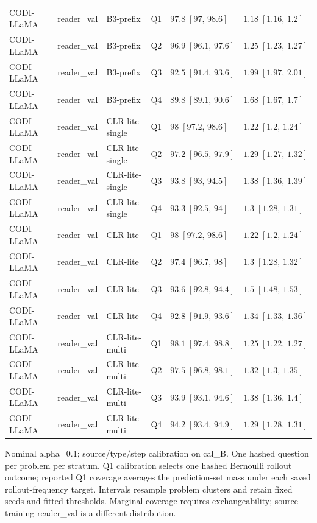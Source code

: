 \begin{longtable}{@{}p{}p{}p{}p{}p{}p{}@{}}
CODI-LLaMA & reader\_val & B3-prefix & Q1 & $97.8\;[97,\,98.6]$ & $1.18\;[1.16,\,1.2]$ \\
CODI-LLaMA & reader\_val & B3-prefix & Q2 & $96.9\;[96.1,\,97.6]$ & $1.25\;[1.23,\,1.27]$ \\
CODI-LLaMA & reader\_val & B3-prefix & Q3 & $92.5\;[91.4,\,93.6]$ & $1.99\;[1.97,\,2.01]$ \\
CODI-LLaMA & reader\_val & B3-prefix & Q4 & $89.8\;[89.1,\,90.6]$ & $1.68\;[1.67,\,1.7]$ \\
CODI-LLaMA & reader\_val & CLR-lite-single & Q1 & $98\;[97.2,\,98.6]$ & $1.22\;[1.2,\,1.24]$ \\
CODI-LLaMA & reader\_val & CLR-lite-single & Q2 & $97.2\;[96.5,\,97.9]$ & $1.29\;[1.27,\,1.32]$ \\
CODI-LLaMA & reader\_val & CLR-lite-single & Q3 & $93.8\;[93,\,94.5]$ & $1.38\;[1.36,\,1.39]$ \\
CODI-LLaMA & reader\_val & CLR-lite-single & Q4 & $93.3\;[92.5,\,94]$ & $1.3\;[1.28,\,1.31]$ \\
CODI-LLaMA & reader\_val & CLR-lite & Q1 & $98\;[97.2,\,98.6]$ & $1.22\;[1.2,\,1.24]$ \\
CODI-LLaMA & reader\_val & CLR-lite & Q2 & $97.4\;[96.7,\,98]$ & $1.3\;[1.28,\,1.32]$ \\
CODI-LLaMA & reader\_val & CLR-lite & Q3 & $93.6\;[92.8,\,94.4]$ & $1.5\;[1.48,\,1.53]$ \\
CODI-LLaMA & reader\_val & CLR-lite & Q4 & $92.8\;[91.9,\,93.6]$ & $1.34\;[1.33,\,1.36]$ \\
CODI-LLaMA & reader\_val & CLR-lite-multi & Q1 & $98.1\;[97.4,\,98.8]$ & $1.25\;[1.22,\,1.27]$ \\
CODI-LLaMA & reader\_val & CLR-lite-multi & Q2 & $97.5\;[96.8,\,98.1]$ & $1.32\;[1.3,\,1.35]$ \\
CODI-LLaMA & reader\_val & CLR-lite-multi & Q3 & $93.9\;[93.1,\,94.6]$ & $1.38\;[1.36,\,1.4]$ \\
CODI-LLaMA & reader\_val & CLR-lite-multi & Q4 & $94.2\;[93.4,\,94.9]$ & $1.29\;[1.28,\,1.31]$ \\
\bottomrule
\end{longtable}
\noindent Nominal alpha=0.1; source/type/step calibration on cal\_B. One hashed question per problem per stratum. Q1 calibration selects one hashed Bernoulli rollout outcome; reported Q1 coverage averages the prediction-set mass under each saved rollout-frequency target. Intervals resample problem clusters and retain fixed seeds and fitted thresholds. Marginal coverage requires exchangeability; source-training reader\_val is a different distribution.
\endgroup
